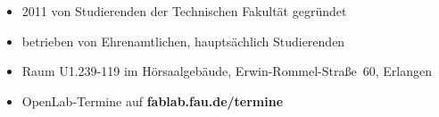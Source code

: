 \begin{itemize}
  \item 2011 von Studierenden der Technischen Fakultät gegründet
  \item betrieben von Ehrenamtlichen, hauptsächlich Studierenden
  \item Raum U1.239-119 im Hörsaalgebäude, Erwin-Rommel-Straße~60,
    Erlangen
  \item OpenLab-Termine auf \textbf{fablab.fau.de/termine}
\end{itemize}

